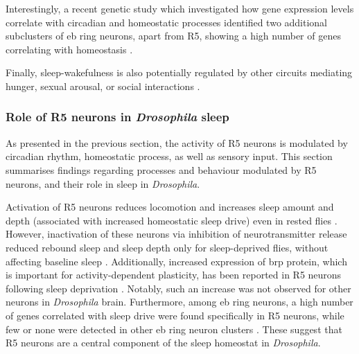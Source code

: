 \documentclass[../main.tex]{subfiles}
\begin{document}
Interestingly, a recent genetic study which investigated how gene expression levels correlate with circadian and homeostatic processes identified two additional subclusters of \gls{eb} ring neurons, apart from R5, showing a high number of genes correlating with homeostasis \cite{doppSinglecellTranscriptomicsReveals2024}.

Finally, sleep-wakefulness is also potentially regulated by other circuits mediating hunger, sexual arousal, or
social interactions \cite{suarez-grimaltNeuralArchitectureSleep2021,shaferRegulationDrosophilaSleep2021}.


\subsubsection{Role of R5 neurons in \textit{Drosophila} sleep} \label{subsubsec:role_of_r5_neurons}

As presented in the previous section, the activity of R5 neurons is modulated by circadian rhythm, homeostatic process, as well as sensory input. This section summarises findings regarding processes and behaviour modulated by R5 neurons, and their role in sleep in \textit{Drosophila}.

Activation of R5 neurons reduces locomotion and increases sleep amount and depth (associated with increased homeostatic sleep drive) even in rested flies \cite{raccugliaCoherentMultilevelNetwork2022,liuSleepDriveEncoded2016}.
However, inactivation of these neurons via inhibition of neurotransmitter release reduced rebound sleep and sleep depth only for sleep-deprived flies, without affecting baseline sleep \cite{liuSleepDriveEncoded2016}.
Additionally, increased expression of \gls{brp} protein, which is important for activity-dependent plasticity, has been reported in R5 neurons following sleep deprivation \cite{liuSleepDriveEncoded2016}.
Notably, such an increase was not observed for other neurons in \textit{Drosophila} brain. Furthermore, among \gls{eb} ring neurons, a high number of genes correlated with sleep drive were found specifically in R5 neurons, while few or none were detected in other \gls{eb} ring neuron clusters \cite{doppSinglecellTranscriptomicsReveals2024}. These suggest that R5 neurons are a central component of the sleep homeostat in \textit{Drosophila}.
\end{document}
